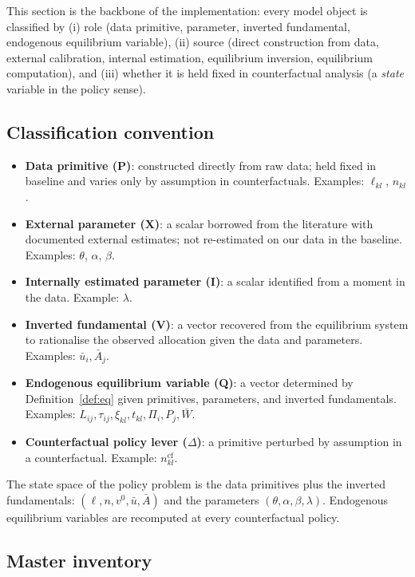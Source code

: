\documentclass[12pt]{article}
\newcommand{\Wbar}{\bar W}
\newcommand{\ubar}{\bar u}
\newcommand{\Abar}{\bar A}
\newcommand{\tkl}{t_{kl}}
\newcommand{\tijk}{\tau_{ij}}
\newcommand{\cf}{\mathrm{cf}}
\begin{document}
This section is the backbone of the implementation: every model
object is classified by (i) role (data primitive, parameter,
inverted fundamental, endogenous equilibrium variable), (ii) source
(direct construction from data, external calibration, internal
estimation, equilibrium inversion, equilibrium computation), and
(iii) whether it is held fixed in counterfactual analysis (a
\emph{state} variable in the policy sense).

\subsection{Classification convention}\label{ssec:classification}

\begin{itemize}[leftmargin=2em,itemsep=0.2em]
\item \textbf{Data primitive (P)}: constructed directly from raw
  data; held fixed in baseline and varies only by assumption in
  counterfactuals.  Examples: $\ell_{kl}$, $n_{kl}$.
\item \textbf{External parameter (X)}: a scalar borrowed from the
  literature with documented external estimates; not re-estimated on
  our data in the baseline.  Examples: $\theta$, $\alpha$, $\beta$.
\item \textbf{Internally estimated parameter (I)}: a scalar
  identified from a moment in the data.  Example: $\lambda$.
\item \textbf{Inverted fundamental (V)}: a vector recovered from
  the equilibrium system to rationalise the observed allocation
  given the data and parameters.  Examples: $\ubar_i,\Abar_j$.
\item \textbf{Endogenous equilibrium variable (Q)}: a vector
  determined by Definition~\ref{def:eq} given primitives,
  parameters, and inverted fundamentals.  Examples: $L_{ij},\tijk,
  \xi_{kl},\tkl,\Pi_i,P_j,\Wbar$.
\item \textbf{Counterfactual policy lever ($\Delta$)}: a primitive
  perturbed by assumption in a counterfactual.  Example: $n_{kl}^{\cf}$.
\end{itemize}
The state space of the policy problem is the data primitives plus
the inverted fundamentals: $(\ell,n,v^0,\ubar,\Abar)$ and the
parameters $(\theta,\alpha,\beta,\lambda)$.  Endogenous equilibrium
variables are recomputed at every counterfactual policy.

\subsection{Master inventory}\label{ssec:inventory}
\end{document}
